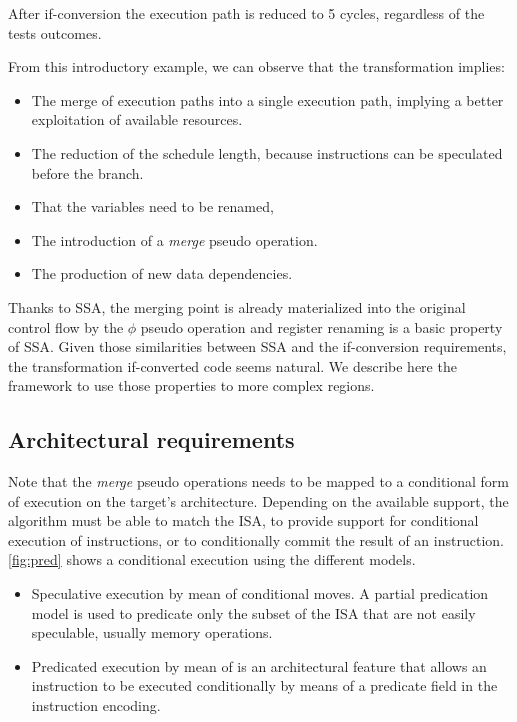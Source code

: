 After if-conversion the execution path is reduced to 5 cycles, regardless of the tests outcomes.

From this introductory example, we can observe that the transformation implies:

\begin{itemize}
\item The merge of execution paths into a single execution path, implying a  better exploitation of available resources.  
\item The reduction of the schedule length, because instructions can be speculated before the branch.
\item That the variables need to be renamed, 
\item The introduction of a \textit{merge} pseudo operation.
\item The production of new data dependencies.
\end{itemize}

Thanks to SSA, the merging point is already materialized into the original control flow by the $\phi$ pseudo operation and register renaming is a basic property of SSA. Given those similarities between SSA and the if-conversion requirements, the transformation if-converted code seems natural. We describe here the framework to use those properties to more complex regions.

\subsection{Architectural requirements}
Note that the \textit{merge} pseudo operations needs to be mapped to a conditional form of execution on the target's architecture. Depending on the available support, the algorithm must be able to match the ISA, to provide support for conditional execution of instructions, or to conditionally commit the result of an instruction. \ref{fig:pred} shows a conditional execution using the different models.

\begin{itemize}
\item Speculative execution by mean of conditional moves. A partial predication model is used to predicate only the subset of the ISA that are not easily speculable, usually memory operations.
\item Predicated execution by mean of is an architectural feature that allows an instruction to be executed conditionally by means of a predicate field in the instruction encoding.
\end{itemize}

